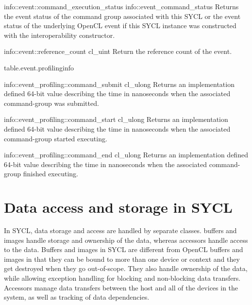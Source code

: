 
\addInfoRow
{info::event::command_execution_status} {info::event_command_status}
{
    Returns the event status of the command group associated with this SYCL  or the event status of the underlying OpenCL event if this SYCL  instance was constructed with the interoperability constructor. 
}

\addInfoRow
{info::event::reference_count}
{cl_uint}
{Return the reference count of the event.}

\completeInfoTable
{table.event.profilinginfo}

\addInfoRow
{info::event_profiling::command_submit}
{cl_ulong}
{
    Returns an implementation defined 64-bit value describing the time in
    nanoseconds when the associated \gls{command-group} was submitted.
}

\addInfoRow
{info::event_profiling::command_start}
{cl_ulong}
{
    Returns an implementation defined 64-bit value describing the time in
    nanoseconds when the associated \gls{command-group} started executing.
}

\addInfoRow
{info::event_profiling::command_end}
{cl_ulong}
{
    Returns an implementation defined 64-bit value describing the time in
    nanoseconds when the associated \gls{command-group} finished executing.
}
\completeInfoTable

\section{Data access and storage in SYCL}
\label{sec:data.access.and.storage}

In SYCL, data storage and access are handled by separate classes.
\Glspl{buffer} and \glspl{image} handle
storage and ownership of the data, whereas \glspl{accessor} handle access to
the data. Buffers and images in SYCL are different from OpenCL buffers and images
in that they can be bound to more than one device or context and they get
destroyed when they go out-of-scope. They also handle ownership of the
data, while allowing exception handling for blocking
and non-blocking data transfers. Accessors manage data transfers between the host
and all of the devices in the system, as well as tracking of data dependencies.

